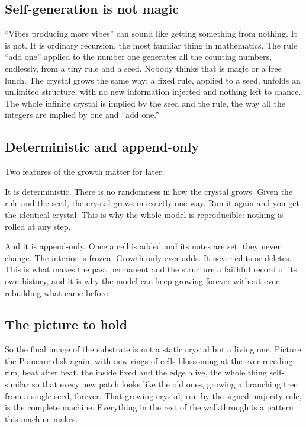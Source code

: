 \subsection{Self-generation is not magic}

``Vibes producing more vibes'' can sound like getting something from nothing. It is not. It is ordinary recursion, the most familiar thing in mathematics. The rule ``add one'' applied to the number one generates all the counting numbers, endlessly, from a tiny rule and a seed. Nobody thinks that is magic or a free lunch. The crystal grows the same way: a fixed rule, applied to a seed, unfolds an unlimited structure, with no new information injected and nothing left to chance. The whole infinite crystal is implied by the seed and the rule, the way all the integers are implied by one and ``add one.''

\subsection{Deterministic and append-only}

Two features of the growth matter for later.

It is deterministic. There is no randomness in how the crystal grows. Given the rule and the seed, the crystal grows in exactly one way. Run it again and you get the identical crystal. This is why the whole model is reproducible: nothing is rolled at any step.

And it is append-only. Once a cell is added and its notes are set, they never change. The interior is frozen. Growth only ever adds. It never edits or deletes. This is what makes the past permanent and the structure a faithful record of its own history, and it is why the model can keep growing forever without ever rebuilding what came before.

\subsection{The picture to hold}

So the final image of the substrate is not a static crystal but a living one. Picture the Poincare disk again, with new rings of cells blossoming at the ever-receding rim, beat after beat, the inside fixed and the edge alive, the whole thing self-similar so that every new patch looks like the old ones, growing a branching tree from a single seed, forever. That growing crystal, run by the signed-majority rule, is the complete machine. Everything in the rest of the walkthrough is a pattern this machine makes.

